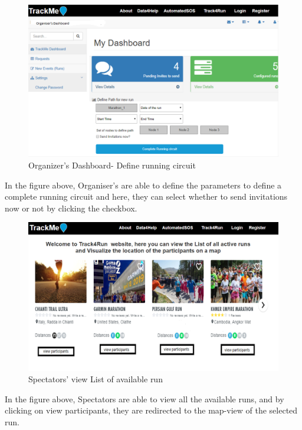 \documentclass[a4paper, hidelinks, 12pt]{report}
\begin{document}
	 \begin{figure}[H]
		\centering
		\includegraphics[scale=0.35]{../Assets/organizer_dashboard_2.png}\caption[UI: Organiser's Dashboard - Define running circuit]{Organizer's Dashboard- Define running circuit}
		\label{fig:Make_Request}
	\end{figure}
	In the figure above, Organiser's are able to define the parameters to define a complete running circuit and here, they can select whether to send invitations now or not by clicking the checkbox.
	
	\begin{figure}[H]
		\centering
		\includegraphics[scale=0.35]{../Assets/t4r_list_of_available_run.png}\caption[UI: Spectators' view List of available run]{Spectators' view List of available run}
		\label{fig:Make_Request}
	\end{figure}
	In the figure above, Spectators are able to view all the available runs, and by clicking on view participants, they are redirected to the map-view of the selected run. 
	
\end{document}
